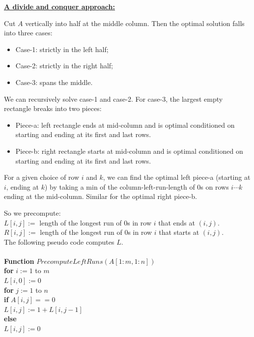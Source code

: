 \documentclass[11pt]{article}
\begin{document}
\underline{\textbf{A divide and conquer approach:}}

Cut $A$ vertically into half at the middle column. Then the optimal
solution falls into three cases:
\begin{itemize}
\item Case-1: strictly in the left half;
\item Case-2: strictly in the right half;
\item Case-3: spans the middle.
\end{itemize}

We can recursively solve case-1 and case-2. For case-3, the largest
empty rectangle breaks into two pieces:
\begin{itemize}
\item Piece-a: left rectangle ends at mid-column and is optimal
  conditioned on starting and ending at its first and last rows. 
\item Piece-b: right rectangle starts at mid-column and is optimal
  conditioned on starting and ending at its first and last rows. 
\end{itemize}

For a given choice of row $i$ and $k$, we can find the optimal left
piece-a (starting at $i$, ending at $k$) by taking a min of the
column-left-run-length of 0s on rows $i \cdots
k$ ending at the mid-column. Similar for the optimal right piece-b. 

So we precompute:\\
$L[i,j] :=$ length of the longest run of 0s in row $i$ that ends at
$(i,j)$.\\
$R[i,j] :=$ length of the longest run of 0s in row $i$ that starts at
$(i,j)$.\\

The following pseudo code computes $L$.\\\\
\textbf{Function} $PrecomputeLeftRuns(A[1:m, 1:n])$\\
\-\hspace{2em} \textbf{for} $i := 1$ to $m$\\
\-\hspace{4em} $L[i, 0] := 0$\\
\-\hspace{4em} \textbf{for} $j := 1$ to $n$\\
\-\hspace{6em} \textbf{if} $A[i,j] == 0$\\
\-\hspace{8em} $L[i,j] := 1 + L[i, j-1]$\\
\-\hspace{6em} \textbf{else}\\
\-\hspace{8em} $L[i,j] := 0$\\
\end{document}
